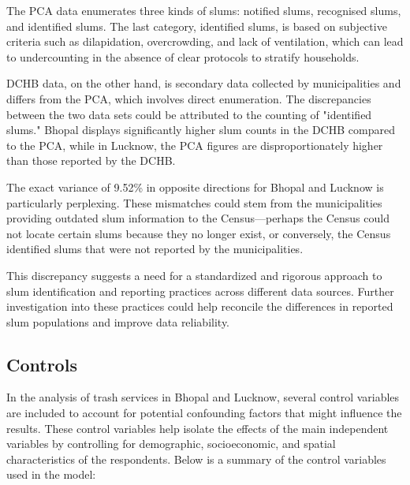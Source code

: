 The PCA data enumerates three kinds of slums: notified slums, recognised slums, and identified slums. The last category, identified slums, is based on subjective criteria such as dilapidation, overcrowding, and lack of ventilation, which can lead to undercounting in the absence of clear protocols to stratify households.

DCHB data, on the other hand, is secondary data collected by municipalities and differs from the PCA, which involves direct enumeration. The discrepancies between the two data sets could be attributed to the counting of "identified slums." Bhopal displays significantly higher slum counts in the DCHB compared to the PCA, while in Lucknow, the PCA figures are disproportionately higher than those reported by the DCHB.

The exact variance of 9.52\% in opposite directions for Bhopal and Lucknow is particularly perplexing. These mismatches could stem from the municipalities providing outdated slum information to the Census—perhaps the Census could not locate certain slums because they no longer exist, or conversely, the Census identified slums that were not reported by the municipalities.

This discrepancy suggests a need for a standardized and rigorous approach to slum identification and reporting practices across different data sources. Further investigation into these practices could help reconcile the differences in reported slum populations and improve data reliability.

\subsection{ Controls}

In the analysis of trash  services in Bhopal and Lucknow, several control variables are included to account for potential confounding factors that might influence the results. These control variables help isolate the effects of the main independent variables by controlling for demographic, socioeconomic, and spatial characteristics of the respondents. Below is a summary of the control variables used in the model:

